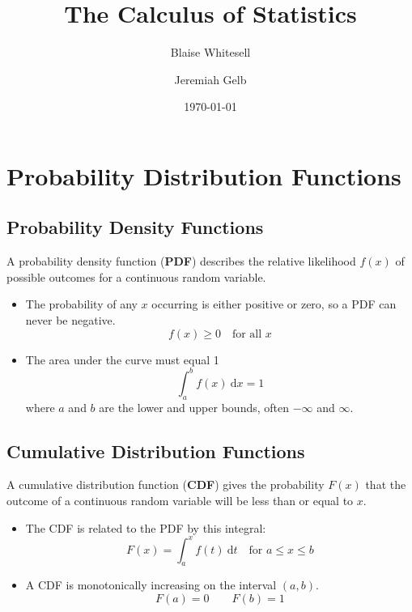 \documentclass[12pt,letterpaper]{article}
\title{The Calculus of Statistics}
\author{Blaise Whitesell \and Jeremiah Gelb}
\date{\today}
\begin{document}
\newcommand{\bdef}[1]{\textbf{#1}} %
\newcommand{\dx}{\:\mathrm{d}x} %
\newcommand{\dt}{\:\mathrm{d}t} %
\newcommand{\dth}{\:\mathrm{d}\theta} %
\newtheorem{problem}{Problem}
\maketitle
\section{Probability Distribution Functions}
\subsection{Probability Density Functions}
A probability density function (\bdef{PDF}) describes
the relative likelihood $f(x)$ of possible outcomes
for a continuous random variable.
\begin{itemize}
\item The probability of any $x$ occurring is either positive or zero,
so a PDF can never be negative.
\begin{equation*}
f(x) \geq 0 \quad \text{for all }x
\end{equation*}
\item The area under the curve must equal 1
\begin{equation*}
\int_a^b f(x)\dx = 1
\end{equation*}
where $a$ and $b$ are the lower and upper bounds,
often $-\infty$ and $\infty$.
\end{itemize}
\subsection{Cumulative Distribution Functions}
A cumulative distribution function (\bdef{CDF}) gives
the probability $F(x)$ that the outcome of a
continuous random variable will be less than or equal to $x$.
\begin{itemize}
\item The CDF is related to the PDF by this integral:
\begin{equation*}
F(x) = \int_a^x f(t) \dt \quad \text{for } a \leq x \leq b
\end{equation*}
\item A CDF is monotonically increasing on the interval $(a,b)$.
\begin{equation*}
F(a) = 0 \qquad F(b) = 1
\end{equation*}
\end{itemize}
\end{document}
